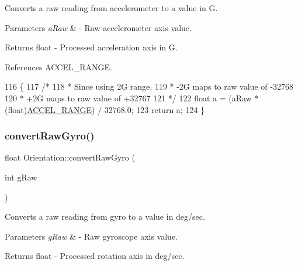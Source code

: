 Converts a raw reading from accelerometer to a value in G. 


\begin{DoxyParams}{Parameters}
{\em a\+Raw} & -\/ Raw accelerometer axis value. \\
\hline
\end{DoxyParams}
\begin{DoxyReturn}{Returns}
float -\/ Processed acceleration axis in G. 
\end{DoxyReturn}


References A\+C\+C\+E\+L\+\_\+\+R\+A\+N\+GE.


\begin{DoxyCode}
116 \{
117   \textcolor{comment}{/*}
118 \textcolor{comment}{   * Since using 2G range.}
119 \textcolor{comment}{   * -2G maps to raw value of -32768}
120 \textcolor{comment}{   * +2G maps to raw value of +32767}
121 \textcolor{comment}{   */}
122    \textcolor{keywordtype}{float} a = (aRaw * (float)\hyperlink{_orientation_8cpp_a16ec7011dea5773b504e875852f35fc1}{ACCEL\_RANGE}) / 32768.0;
123    \textcolor{keywordflow}{return} a;
124 \}
\end{DoxyCode}
\mbox{\label{class_orientation_a99bb5ed3c3226c5d636fa48f26f491dd}} 
\subsubsection{\texorpdfstring{convert\+Raw\+Gyro()}{convertRawGyro()}}
{\footnotesize\ttfamily float Orientation\+::convert\+Raw\+Gyro (\begin{DoxyParamCaption}\item[{int}]{g\+Raw }\end{DoxyParamCaption})\hspace{0.3cm}{\ttfamily [private]}}



Converts a raw reading from gyro to a value in deg/sec. 


\begin{DoxyParams}{Parameters}
{\em g\+Raw} & -\/ Raw gyroscope axis value. \\
\hline
\end{DoxyParams}
\begin{DoxyReturn}{Returns}
float -\/ Processed rotation axis in deg/sec. 
\end{DoxyReturn}


